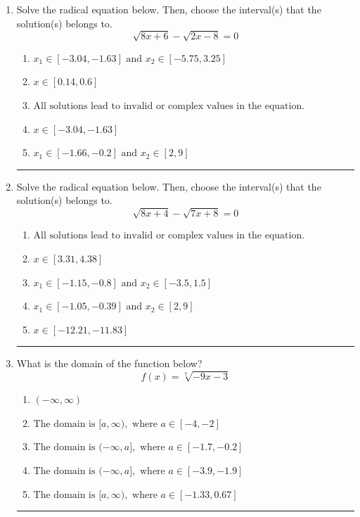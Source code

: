 \documentclass[14pt]{extbook}
\newcommand{\litem}[1]{\item#1\hspace*{-1cm}\rule{\textwidth}{0.4pt}}
\begin{document}
\begin{enumerate}
{\begin{enumerate}[label=\Alph*.]
\end{enumerate} }
\litem{
Solve the radical equation below. Then, choose the interval(s) that the solution(s) belongs to.\[ \sqrt{8 x + 6} - \sqrt{2 x - 8} = 0 \]\begin{enumerate}[label=\Alph*.]
\item \( x_1 \in [-3.04, -1.63] \text{ and } x_2 \in [-5.75,3.25] \)
\item \( x \in [0.14,0.6] \)
\item \( \text{All solutions lead to invalid or complex values in the equation.} \)
\item \( x \in [-3.04,-1.63] \)
\item \( x_1 \in [-1.66, -0.2] \text{ and } x_2 \in [2,9] \)

\end{enumerate} }
\litem{
Solve the radical equation below. Then, choose the interval(s) that the solution(s) belongs to.\[ \sqrt{8 x + 4} - \sqrt{7 x + 8} = 0 \]\begin{enumerate}[label=\Alph*.]
\item \( \text{All solutions lead to invalid or complex values in the equation.} \)
\item \( x \in [3.31,4.38] \)
\item \( x_1 \in [-1.15, -0.8] \text{ and } x_2 \in [-3.5,1.5] \)
\item \( x_1 \in [-1.05, -0.39] \text{ and } x_2 \in [2,9] \)
\item \( x \in [-12.21,-11.83] \)

\end{enumerate} }
\litem{
What is the domain of the function below?\[ f(x) = \sqrt[7]{-9 x - 3} \]\begin{enumerate}[label=\Alph*.]
\item \( (-\infty, \infty) \)
\item \( \text{The domain is } [a, \infty), \text{   where } a \in [-4, -2] \)
\item \( \text{The domain is } (-\infty, a], \text{   where } a \in [-1.7, -0.2] \)
\item \( \text{The domain is } (-\infty, a], \text{   where } a \in [-3.9, -1.9] \)
\item \( \text{The domain is } [a, \infty), \text{   where } a \in [-1.33, 0.67] \)


\end{enumerate}}
\end{enumerate}
\end{document}
